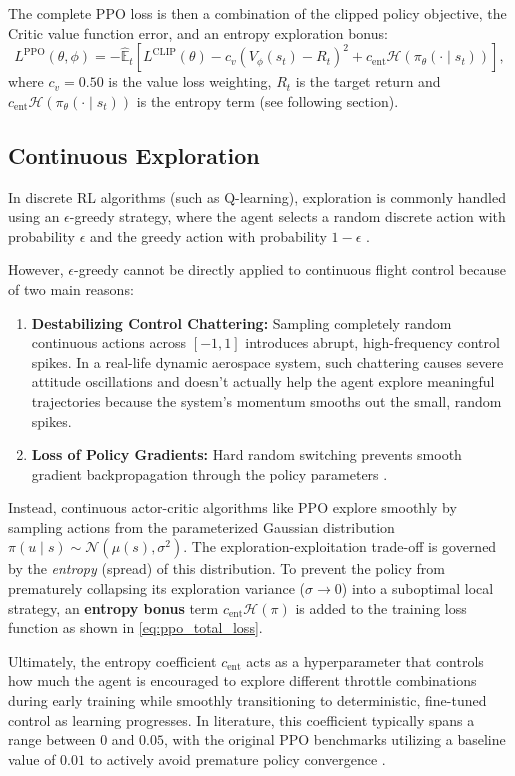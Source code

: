 The complete PPO loss is then a combination of the clipped policy objective, the Critic value function error, and an entropy exploration bonus:
\begin{equation}
    L^{\text{PPO}}(\theta, \phi) = -\hat{\mathbb{E}}_t \left[ L^{\text{CLIP}}(\theta) - c_v (V_\phi(s_t) - R_t)^2 + c_{\text{ent}} \mathcal{H}(\pi_\theta(\cdot \mid s_t)) \right],
    \label{eq:ppo_total_loss}
\end{equation}
where $c_v = 0.50$ is the value loss weighting, $R_t$ is the target return and $c_{\text{ent}} \mathcal{H}(\pi_\theta(\cdot \mid s_t))$ is the entropy term (see following section).

\subsection{Continuous Exploration}
\label{sec:continuous_exploration}
In discrete RL algorithms (such as Q-learning), exploration is commonly handled using an $\epsilon$-greedy strategy, where the agent selects a random discrete action with probability $\epsilon$ and the greedy action with probability $1-\epsilon$ \cite{vankampen2025lecture}.

However, $\epsilon$-greedy cannot be directly applied to continuous flight control because of two main reasons:
\begin{enumerate}[leftmargin=*,label=\textbf{\arabic*.}]
    \item \textbf{Destabilizing Control Chattering:} Sampling completely random continuous actions across $[-1, 1]$ introduces abrupt, high-frequency control spikes. In a real-life dynamic aerospace system, such chattering causes severe attitude oscillations and doesn't actually help the agent explore meaningful trajectories because the system's momentum smooths out the small, random spikes.
    \item \textbf{Loss of Policy Gradients:} Hard random switching prevents smooth gradient backpropagation through the policy parameters  \cite{sutton2018reinforcement}.
\end{enumerate}

Instead, continuous actor-critic algorithms like PPO explore smoothly by sampling actions from the parameterized Gaussian distribution $\pi(u \mid s) \sim \mathcal{N}(\mu(s), \sigma^2)$. The exploration-exploitation trade-off is governed by the \emph{entropy} (spread) of this distribution. To prevent the policy from prematurely collapsing its exploration variance ($\sigma \to 0$) into a suboptimal local strategy, an \textbf{entropy bonus} term $c_{\text{ent}} \mathcal{H}(\pi)$ is added to the training loss function as shown in \cref{eq:ppo_total_loss}.

Ultimately, the entropy coefficient $c_{\text{ent}}$ acts as a hyperparameter that controls how much the agent is encouraged to explore different throttle combinations during early training while smoothly transitioning to deterministic, fine-tuned control as learning progresses. In literature, this coefficient typically spans a range between \(0\) and \(0.05\), with the original PPO benchmarks utilizing a baseline value of \(0.01\) to actively avoid premature policy convergence \cite{schulman2017proximal}.
